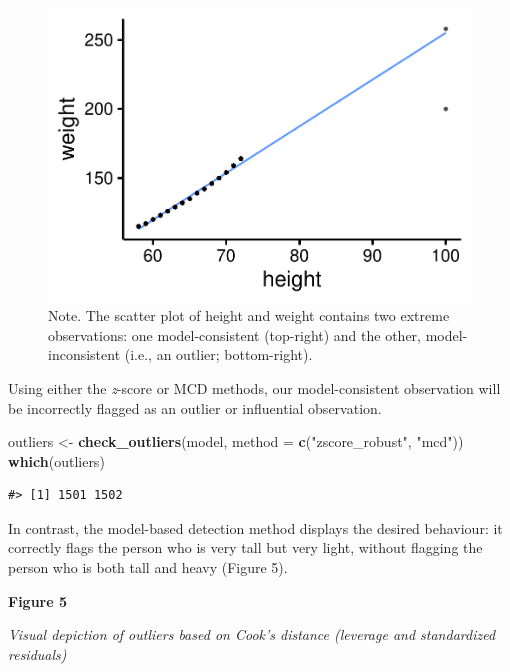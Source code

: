 \documentclass[sn-basic, lineno,pdflatex]{sn-jnl}
\newenvironment{Shaded}{\begin{snugshade}}{\end{snugshade}}
\newcommand{\AttributeTok}[1]{\textcolor[rgb]{0.13,0.29,0.53}{#1}}
\newcommand{\FunctionTok}[1]{\textcolor[rgb]{0.13,0.29,0.53}{\textbf{#1}}}
\newcommand{\NormalTok}[1]{#1}
\newcommand{\OtherTok}[1]{\textcolor[rgb]{0.56,0.35,0.01}{#1}}
\newcommand{\StringTok}[1]{\textcolor[rgb]{0.31,0.60,0.02}{#1}}
\begin{document}
\begin{figure}
\includegraphics[width=1\linewidth]{paper_files/figure-latex/scatter-1} \caption{Note. The scatter plot of height and weight contains two extreme observations: one model-consistent (top-right) and the other, model-inconsistent (i.e., an outlier; bottom-right).}\label{fig:scatter}
\end{figure}

Using either the \emph{z}-score or MCD methods, our model-consistent
observation will be incorrectly flagged as an outlier or influential
observation.

\begin{Shaded}
\begin{Highlighting}[]
\NormalTok{outliers }\OtherTok{\textless{}{-}} \FunctionTok{check\_outliers}\NormalTok{(model, }\AttributeTok{method =} \FunctionTok{c}\NormalTok{(}\StringTok{"zscore\_robust"}\NormalTok{, }\StringTok{"mcd"}\NormalTok{))}
\FunctionTok{which}\NormalTok{(outliers)}
\end{Highlighting}
\end{Shaded}

\begin{verbatim}
#> [1] 1501 1502
\end{verbatim}

In contrast, the model-based detection method displays the desired
behaviour: it correctly flags the person who is very tall but very
light, without flagging the person who is both tall and heavy (Figure
5).

\textbf{Figure 5}

\emph{Visual depiction of outliers based on Cook's distance (leverage
and standardized residuals)}
\end{document}
